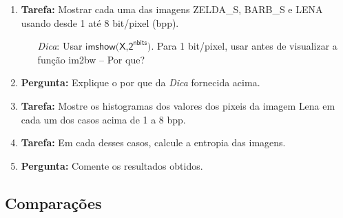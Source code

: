 \documentclass[11pt]{article}
\begin{document}
\begin{enumerate}

\item \textbf{Tarefa:} Mostrar cada uma das imagens \textsf{ZELDA\_S}, \textsf{BARB\_S} e \textsf{LENA} usando desde 1 até 8 bit/pixel (bpp). 

\begin{enumerate}
\item[\textit{Dica}:] Usar $\textsf{imshow(X,2}^{\textsf{nbits}}\textsf{)}$. Para 1 bit/pixel, usar antes de visualizar a função im2bw -- Por que?
\end{enumerate}

\item \textbf{Pergunta:} Explique o por que da \textit{Dica} fornecida acima.

\item \textbf{Tarefa:} Mostre os histogramas dos valores dos pixeis da imagem \textsf{Lena} em cada um dos casos acima de 1 a 8 bpp.

\item \textbf{Tarefa:} Em cada desses casos, calcule a entropia das imagens.

\item \textbf{Pergunta:} Comente os resultados obtidos.

\end{enumerate}

\subsection{Comparações}
\end{document}
